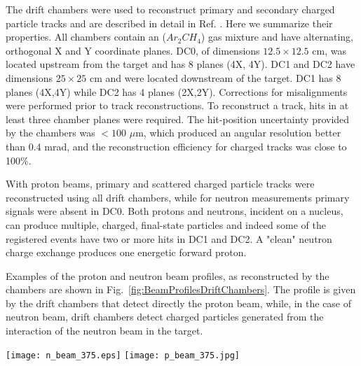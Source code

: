 \documentclass[epj]{svjour}
\begin{document}
The drift chambers were used to reconstruct primary and secondary charged particle tracks  and are described in detail in Ref. \cite{Strela:2013}. Here we summarize their properties. All chambers contain an  ($Ar_2CH_4$) 
gas mixture and have alternating, orthogonal X and Y coordinate planes. DC0, of dimensions $12.5\times12.5$ cm, was located upstream from the target and has 8 planes (4X, 4Y). DC1 and DC2 have dimensions $25\times 25$ cm and were located downstream of the target. DC1 has 8 planes (4X,4Y) while DC2 has 4 planes (2X,2Y). 
Corrections for misalignments were performed prior to track reconstructions. To reconstruct a track, hits in at least three chamber planes were required. The hit-position uncertainty provided by the chambers was $<100$ $\mu$m, which produced an angular resolution better than 0.4 mrad, and the reconstruction efficiency for charged tracks was close to 
100\%. 

With proton beams, primary and scattered charged particle tracks were reconstructed using all drift chambers, while for neutron measurements primary signals were absent in DC0. Both protons and neutrons, incident on a nucleus, can produce multiple, charged, final-state particles and indeed some of the registered events have two or more hits in DC1 and DC2.
A "clean" neutron charge exchange produces one energetic forward proton.

 Examples of the proton and neutron beam profiles, as reconstructed by the chambers are shown in Fig.~\ref{fig:BeamProfilesDriftChambers}. The profile is given by the drift chambers that detect directly the proton beam, while, in the case of  neutron beam, drift chambers detect charged particles generated  from the interaction  of the neutron beam in the target. 
\begin{figure*}
\centering
\texttt{[image: n\_beam\_375.eps]}
\texttt{[image: p\_beam\_375.jpg]}
\caption{Neutron (left) and proton (right) beam profiles in the transverse X-Y plane, as recorded by the drift chambers, for 3.75\,GeV/c momentum and before a 30\,cm long CH$_{2}$ target. }
\label{fig:BeamProfilesDriftChambers}
\end{figure*}
\end{document}
